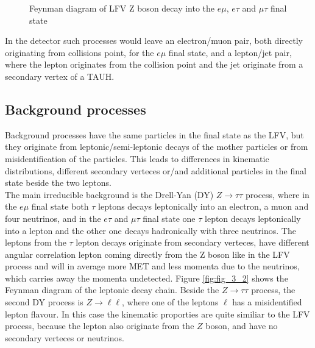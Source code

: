 \begin{figure}
	
	\caption[Feynman diagram of LFV Z boson decay]{Feynman diagram of LFV Z boson decay into the $e\mu$, $e\tau$ and $\mu\tau$ final state}
	\label{fig:fig_3_1}

\end{figure}

In the detector such processes would leave an electron/muon pair, both directly originating from collisions point, for the $e\mu$ final state, and a lepton/jet pair, where the lepton originates from the collision point and the jet originate from a secondary vertex of a \gls{TAUH}.  

\subsection{Background processes}

Background processes have the same particles in the final state as the \gls{LFV}, but they originate from leptonic/semi-leptonic decays of the mother particles or from misidentification of the particles. This leads to differences in kinematic distributions, different secondary verteces or/and additional particles in the final state beside the two leptons. \\

The main irreducible background is the Drell-Yan (\gls{DY}) $Z\to\tau\tau$ process, where in the $e\mu$ final state both $\tau$ leptons decays leptonically into an electron, a muon and four neutrinos, and in the $e\tau$ and $\mu\tau$ final state one $\tau$ lepton decays leptonically into a lepton and the other one decays hadronically with three neutrinos. The leptons from the $\tau$ lepton decays originate from secondary verteces, have different angular correlation lepton coming directly from the Z boson like in the \gls{LFV} process and will in average more \gls{MET} and less momenta due to the neutrinos, which carries away the momenta undetected. Figure \ref{fig:fig_3_2} shows the Feynman diagram of the leptonic decay chain. Beside the $Z\to\tau\tau$ process, the second \gls{DY} process is $Z\to\ell\ell$, where one of the leptons $\ell$ has a misidentified lepton flavour. In this case the kinematic proporties are quite similiar to the \gls{LFV} process, because the lepton also originate from the $Z$ boson, and have no secondary verteces or neutrinos. \\


